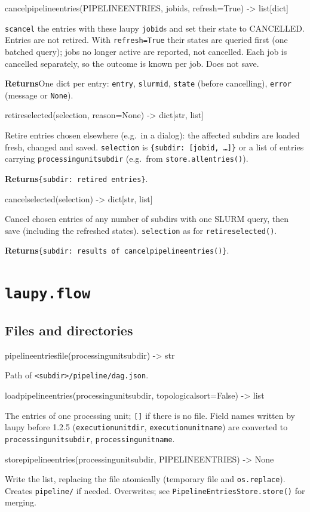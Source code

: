 \documentclass[11pt,a4paper]{article}
\newcommand{\api}[1]{%
  \par\medskip
  \begin{tcolorbox}[colback=sigbg, colframe=sigbg, boxrule=0pt, arc=1pt, left=4pt, right=4pt, top=2pt, bottom=2pt, breakable]
  \raggedright\ttfamily\small #1
  \end{tcolorbox}\nopagebreak\vspace{-4pt}%
}
\DeclareRobustCommand{\_}{\textunderscore\allowbreak}
\newcommand{\cmd}[1]{\texttt{#1}}
\newcommand{\returns}{\par\textsf{\small\bfseries Returns}\quad}
\begin{document}
\api{cancel\_pipeline\_entries(PIPELINE\_ENTRIES, job\_ids, refresh=True) -> list[dict]}
\cmd{scancel} the entries with these laupy \cmd{job\_id}s and set their state to CANCELLED. Entries
are not retired. With \cmd{refresh=True} their states are queried first (one batched query); jobs no
longer active are reported, not cancelled. Each job is cancelled separately, so the outcome is
known per job. Does not save.
\returns One dict per entry: \cmd{entry}, \cmd{slurm\_id}, \cmd{state} (before cancelling),
\cmd{error} (message or \cmd{None}).

\api{retire\_selected(selection, reason=None) -> dict[str, list]}
Retire entries chosen elsewhere (e.g.\ in a dialog): the affected subdirs are loaded fresh, changed
and saved.
\cmd{selection} is \cmd{\{subdir: [job\_id, \ldots]\}} or a list of entries carrying
\cmd{processing\_unit\_subdir} (e.g.\ from \cmd{store.all\_entries()}).
\returns \cmd{\{subdir: retired entries\}}.

\api{cancel\_selected(selection) -> dict[str, list]}
Cancel chosen entries of any number of subdirs with one SLURM query, then save (including the
refreshed states). \cmd{selection} as for \cmd{retire\_selected()}.
\returns \cmd{\{subdir: results of cancel\_pipeline\_entries()\}}.

\section{\texorpdfstring{\cmd{laupy.flow}}{laupy.flow}}

\subsection{Files and directories}

\api{pipeline\_entries\_file(processing\_unit\_subdir) -> str}
Path of \cmd{<subdir>/pipeline/dag.json}.

\api{load\_pipeline\_entries(processing\_unit\_subdir, topological\_sort=False) -> list}
The entries of one processing unit; \cmd{[]} if there is no file. Field names written by laupy
before 1.2.5 (\cmd{execution\_unit\_dir}, \cmd{execution\_unit\_name}) are converted to
\cmd{processing\_unit\_subdir}, \cmd{processing\_unit\_name}.

\api{store\_pipeline\_entries(processing\_unit\_subdir, PIPELINE\_ENTRIES) -> None}
Write the list, replacing the file atomically (temporary file and \cmd{os.replace}). Creates
\cmd{pipeline/} if needed. Overwrites; see \cmd{PipelineEntriesStore.store()} for merging.
\end{document}
